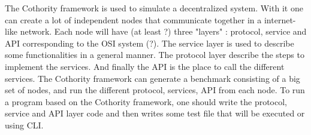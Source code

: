 The Cothority framework is used to simulate a decentralized system. With it one can create a lot of independent nodes that communicate together in a internet-like network. Each node will have (at least ?) three "layers" : protocol, service and API corresponding to the OSI system (?). The service layer is used to describe some functionalities in a general manner. The protocol layer describe the steps to implement the services. And finally the API is the place to call the different services. The Cothority framework can generate a benchmark consisting of a big set of nodes, and run the different protocol, services, API from each node. To run a program based on the Cothority framework, one should write the protocol, service and API layer code and then writes some test file that will be executed or using CLI.

